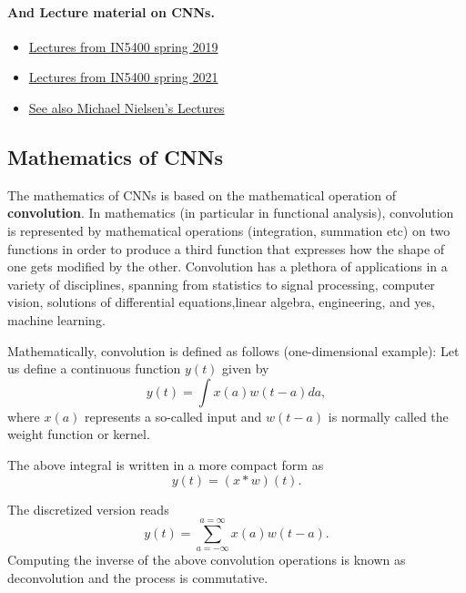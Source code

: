 \documentclass[%
oneside,                 %
final,                   %
10pt]{article}
\begin{document}
\paragraph{And Lecture material on CNNs.}
\begin{itemize}
\item \href{{https://www.uio.no/studier/emner/matnat/ifi/IN5400/v19/material/week5/in5400_2019_week5_convolutional_nerual_networks.pdf}}{Lectures from IN5400 spring 2019}

\item \href{{https://www.uio.no/studier/emner/matnat/ifi/IN5400/v21/lecture-slides/in5400_2021_w5_lecture_convolutions.pdf}}{Lectures from IN5400 spring 2021}

\item \href{{http://neuralnetworksanddeeplearning.com/chap6.html}}{See also Michael Nielsen's Lectures}
\end{itemize}

\noindent



\subsection*{Mathematics of CNNs}

The mathematics of CNNs is based on the mathematical operation of
\textbf{convolution}.  In mathematics (in particular in functional analysis),
convolution is represented by mathematical operations (integration,
summation etc) on two functions in order to produce a third function
that expresses how the shape of one gets modified by the other.
Convolution has a plethora of applications in a variety of
disciplines, spanning from statistics to signal processing, computer
vision, solutions of differential equations,linear algebra,
engineering, and yes, machine learning.

Mathematically, convolution is defined as follows (one-dimensional example):
Let us define a continuous function $y(t)$ given by
\[
y(t) = \int x(a) w(t-a) da,
\]
where $x(a)$ represents a so-called input and $w(t-a)$ is normally called the weight function or kernel.

The above integral is written in  a more compact form as
\[
y(t) = \left(x * w\right)(t).
\]

The discretized version reads
\[
y(t) = \sum_{a=-\infty}^{a=\infty}x(a)w(t-a).
\]
Computing the inverse of the above convolution operations is known as deconvolution and the process is commutative.
\end{document}
